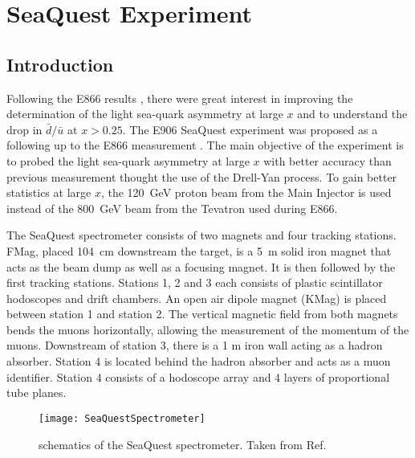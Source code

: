 \documentclass[../main.tex]{subfiles}
\begin{document}
\ifSubfilesClassLoaded{
	\mainmatter
	\setcounter{chapter}{3}
}{}

\chapter{SeaQuest Experiment}
\label{ch:seaquest}

\section{Introduction}
Following the E866 results \cite{towell2001}, there were great interest in improving
the determination of the light sea-quark asymmetry at large $x$ and to understand
the drop in $\bar{d}/\bar{u}$ at $x>0.25$.
The E906 SeaQuest experiment was proposed as a following up to the E866 measurement \cite{isenhower2001}.
The main objective of the experiment is to probed the light sea-quark asymmetry at
large $x$ with better accuracy than previous measurement thought the use of the Drell-Yan
process. To gain better statistics at large $x$, the \SI{120}{\GeV} proton beam from the Main
Injector is used instead of the \SI{800}{\GeV} beam from the Tevatron used during E866.

The SeaQuest spectrometer consists of two magnets and four tracking stations. FMag,
placed \SI{104}{\cm} downstream the target, is a \SI{5}{\m} solid iron magnet
that acts as the beam dump as well as a focusing magnet. It is then followed by
the first tracking stations. Stations 1, 2 and 3 each consists of plastic
scintillator hodoscopes and drift chambers. An open air dipole magnet (KMag) is
placed between station 1 and station 2. The vertical magnetic field from both
magnets bends the muons horizontally, allowing the measurement of the momentum
of the muons. Downstream of station 3, there is a 1 m iron wall acting as a
hadron absorber. Station 4 is located behind the hadron absorber and acts as a
muon identifier. Station 4 consists of a hodoscope array and 4 layers of
proportional tube planes.
\begin{figure}[htbp!]
	\centering
	\texttt{[image: SeaQuestSpectrometer]}
	\caption{schematics of the SeaQuest spectrometer. Taken from Ref.~\cite{aidala2019}}
	\label{fig:spectrometer}
\end{figure}
\end{document}
